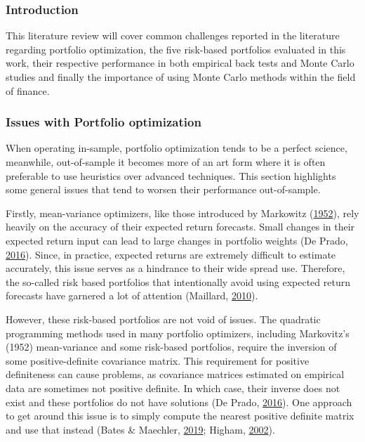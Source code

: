 \documentclass[11pt,preprint, authoryear]{elsarticle}
\numberwithin{equation}{section}
\numberwithin{figure}{section}
\numberwithin{table}{section}
\begin{document}
\hypertarget{introduction-1}{%
\subsubsection{Introduction}\label{introduction-1}}

This literature review will cover common challenges reported in the
literature regarding portfolio optimization, the five risk-based
portfolios evaluated in this work, their respective performance in both
empirical back tests and Monte Carlo studies and finally the importance
of using Monte Carlo methods within the field of finance.

\hypertarget{issues-with-portfolio-optimization}{%
\subsubsection{Issues with Portfolio
optimization}\label{issues-with-portfolio-optimization}}

When operating in-sample, portfolio optimization tends to be a perfect
science, meanwhile, out-of-sample it becomes more of an art form where
it is often preferable to use heuristics over advanced techniques. This
section highlights some general issues that tend to worsen their
performance out-of-sample.

Firstly, mean-variance optimizers, like those introduced by Markowitz
(\protect\hyperlink{ref-markowitz}{1952}), rely heavily on the accuracy
of their expected return forecasts. Small changes in their expected
return input can lead to large changes in portfolio weights (De Prado,
\protect\hyperlink{ref-lopez}{2016}). Since, in practice, expected
returns are extremely difficult to estimate accurately, this issue
serves as a hindrance to their wide spread use. Therefore, the so-called
risk based portfolios that intentionally avoid using expected return
forecasts have garnered a lot of attention (Maillard,
\protect\hyperlink{ref-maillard2010}{2010}).

However, these risk-based portfolios are not void of issues. The
quadratic programming methods used in many portfolio optimizers,
including Markovitz's (1952) mean-variance and some risk-based
portfolios, require the inversion of some positive-definite covariance
matrix. This requirement for positive definiteness can cause problems,
as covariance matrices estimated on empirical data are sometimes not
positive definite. In which case, their inverse does not exist and these
portfolios do not have solutions (De Prado,
\protect\hyperlink{ref-lopez}{2016}). One approach to get around this
issue is to simply compute the nearest positive definite matrix and use
that instead (Bates \& Maechler, \protect\hyperlink{ref-Matrix}{2019};
Higham, \protect\hyperlink{ref-higham2002}{2002}).
\end{document}
